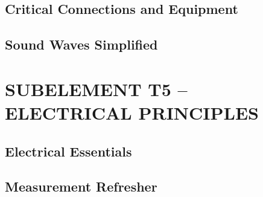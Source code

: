\documentclass[12pt]{book}
\begin{document}
\section{Critical Connections and Equipment}












\section{Sound Waves Simplified}












\chapter{SUBELEMENT T5 – ELECTRICAL PRINCIPLES}
\section{Electrical Essentials}












\section{Measurement Refresher}













\end{document}
